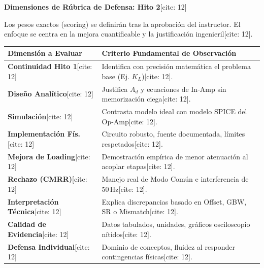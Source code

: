 \documentclass[11pt, a4paper]{article}
\begin{document}
\begin{center}
    \Large\textbf{\textcolor{ucbblue}{Dimensiones de Rúbrica de Defensa: Hito 2}}[cite: 12]
\end{center}

\begin{tcolorbox}[colback=red!5, colframe=red!70!black, title=\textbf{Aviso Docente[cite: 12]}]
    Los pesos exactos (scoring) se definirán tras la aprobación del instructor. El enfoque se centra en la mejora cuantificable y la justificación ingenieril[cite: 12].
\end{tcolorbox}

\begin{table}[h!]
    \centering
    \renewcommand{\arraystretch}{1.5}
    \begin{tabularx}{\textwidth}{|>{\hsize=0.6\hsize}X|>{\hsize=1.4\hsize}X|}
    \hline
    \rowcolor[HTML]{EFEFEF} 
    \textbf{Dimensión a Evaluar} & \textbf{Criterio Fundamental de Observación} \\ \hline
    \textbf{Continuidad Hito 1}[cite: 12] & Identifica con precisión matemática el problema base (Ej. $K_L$)[cite: 12]. \\ \hline
    \textbf{Diseño Analítico}[cite: 12] & Justifica $A_d$ y ecuaciones de In-Amp sin memorización ciega[cite: 12]. \\ \hline
    \textbf{Simulación}[cite: 12] & Contrasta modelo ideal con modelo SPICE del Op-Amp[cite: 12]. \\ \hline
    \textbf{Implementación Fís.}[cite: 12] & Circuito robusto, fuente documentada, límites respetados[cite: 12]. \\ \hline
    \textbf{Mejora de Loading}[cite: 12] & Demostración empírica de menor atenuación al acoplar etapas[cite: 12]. \\ \hline
    \textbf{Rechazo (CMRR)}[cite: 12] & Manejo real de Modo Común e interferencia de $50\,\text{Hz}$[cite: 12]. \\ \hline
    \textbf{Interpretación Técnica}[cite: 12] & Explica discrepancias basado en Offset, GBW, SR o Mismatch[cite: 12]. \\ \hline
    \textbf{Calidad de Evidencia}[cite: 12] & Datos tabulados, unidades, gráficos osciloscopio nítidos[cite: 12]. \\ \hline
    \textbf{Defensa Individual}[cite: 12] & Dominio de conceptos, fluidez al responder contingencias físicas[cite: 12]. \\ \hline
    \end{tabularx}
\end{table}
\end{document}
